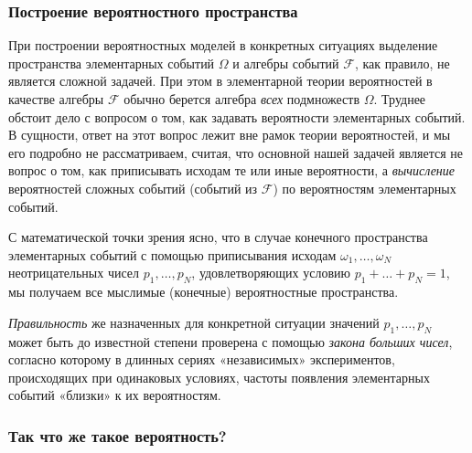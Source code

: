 \documentclass[11pt,a4paper]{article}
\begin{document}
\hypertarget{ux43fux43eux441ux442ux440ux43eux435ux43dux438ux435-ux432ux435ux440ux43eux44fux442ux43dux43eux441ux442ux43dux43eux433ux43e-ux43fux440ux43eux441ux442ux440ux430ux43dux441ux442ux432ux430}{%
\subsubsection{Построение вероятностного
пространства}\label{ux43fux43eux441ux442ux440ux43eux435ux43dux438ux435-ux432ux435ux440ux43eux44fux442ux43dux43eux441ux442ux43dux43eux433ux43e-ux43fux440ux43eux441ux442ux440ux430ux43dux441ux442ux432ux430}}

При построении вероятностных моделей в конкретных ситуациях выделение
пространства элементарных событий \(\Omega\) и алгебры событий
\(\mathcal{F}\), как правило, не является сложной задачей. При этом в
элементарной теории вероятностей в качестве алгебры \(\mathcal{F}\)
обычно берется алгебра \emph{всех} подмножеств \(\Omega\). Труднее
обстоит дело с вопросом о том, как задавать вероятности элементарных
событий. В сущности, ответ на этот вопрос лежит вне рамок теории
вероятностей, и мы его подробно не рассматриваем, считая, что основной
нашей задачей является не вопрос о том, как приписывать исходам те или
иные вероятности, а \emph{вычисление} вероятностей сложных событий
(событий из \(\mathcal{F}\)) по вероятностям элементарных событий.

С математической точки зрения ясно, что в случае конечного пространства
элементарных событий с помощью приписывания исходам
\(\omega_1, \ldots , \omega_N\) неотрицательных чисел
\(p_1, \ldots , p_N\), удовлетворяющих условию
\(p_1 + \ldots + p_N = 1\), мы получаем все мыслимые (конечные)
вероятностные пространства.

\emph{Правильность} же назначенных для конкретной ситуации значений
\(p_1, \ldots , p_N\) может быть до известной степени проверена с
помощью \emph{закона больших чисел}, согласно которому в длинных сериях
«независимых» экспериментов, происходящих при одинаковых условиях,
частоты появления элементарных событий «близки» к их вероятностям.

    \hypertarget{ux442ux430ux43a-ux447ux442ux43e-ux436ux435-ux442ux430ux43aux43eux435-ux432ux435ux440ux43eux44fux442ux43dux43eux441ux442ux44c}{%
\subsubsection{Так что же такое
вероятность?}\label{ux442ux430ux43a-ux447ux442ux43e-ux436ux435-ux442ux430ux43aux43eux435-ux432ux435ux440ux43eux44fux442ux43dux43eux441ux442ux44c}}
\end{document}
